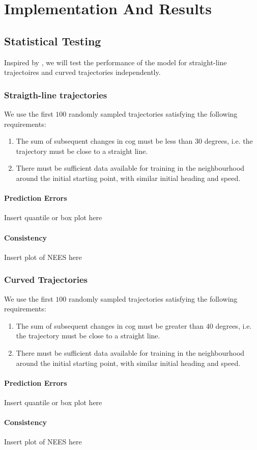 \chapter{Implementation And Results}
\section{Statistical Testing}
Inspired by \cite{hexeberg}, we will test the performance of the model for straight-line trajectoires and curved trajectories independently.
\subsection{Straigth-line trajectories}
We use the first $100$ randomly sampled trajectories satisfying the following requirements:
\begin{enumerate}
    \item The sum of subsequent changes in \acrshort{cog} must be less than $30$ degrees, i.e. the trajectory must be close to a straight line.
    \item There must be sufficient data available for training in the neighbourhood around the initial starting point, with similar initial heading and speed.
\end{enumerate}
\subsubsection{Prediction Errors}
Insert quantile or box plot here
\subsubsection{Consistency}
Insert plot of NEES here

\subsection{Curved Trajectories}
We use the first $100$ randomly sampled trajectories satisfying the following requirements:
\begin{enumerate}
    \item The sum of subsequent changes in \acrshort{cog} must be greater than $40$ degrees, i.e. the trajectory must be close to a straight line.
    \item There must be sufficient data available for training in the neighbourhood around the initial starting point, with similar initial heading and speed.
\end{enumerate}

\subsubsection{Prediction Errors}
Insert quantile or box plot here
\subsubsection{Consistency}
Insert plot of NEES here


